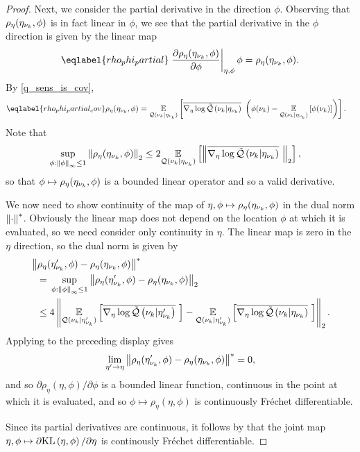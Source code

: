 \begin{lem}
\begin{proof}
Next, we consider the partial derivative in the direction $\phi$.  Observing
that $\rho_\eta(\eta_{\nu_{k}}, \phi)$ is in fact linear in $\phi$, we see that the
partial derivative in the $\phi$ direction is given by the linear map
%
\begin{align}\eqlabel{rho_phi_partial}
%
\fracat{\partial \rho_\eta(\etanuk, \phi)}
       {\partial \phi}{\eta, \phi} \phi =
    \rho_\eta(\etanuk, \phi).
%
\end{align}
%
By  \eqref{q_sens_is_cov},
%
\begin{align}\eqlabel{rho_phi_partial_cov}
%
\rho_\eta(\etanuk, \phi) ={}&
\expect{\q(\nuk \vert \etanuk)}
       {\lqgradbar{\nuk \vert \etanuk} \left(
        \phi(\nuk) - \expect{\q(\nuk \vert \etanuk)}{\phi(\nuk)}
       \right)
       }.
%
\end{align}
%
Note that
%
\begin{align*}
%
\sup_{\phi: \norminf{\phi} \le 1} \norm{\rho_\eta(\etanuk, \phi)}_2 \le{}&
    2 \expect{\q(\nuk \vert \etanuk)}
             {\norm{\lqgradbar{\nuk \vert \etanuk}}_2
             },
%
\end{align*}
%
so that $\phi \mapsto \rho_\eta(\eta_{\nu_{k}}, \phi)$ is a bounded linear operator and
so a valid derivative.

We now need to show continuity of the map of $\eta, \phi \mapsto
\rho_\eta(\eta_{\nu_{k}}, \phi)$ in the dual norm $\left\Vert\cdot\right\Vert^*$.  Obviously the
linear map does not depend on the location $\phi$ at which it is evaluated, so
we need consider only continuity in $\eta$.  The linear map is zero in the
$\eta$ direction, so the dual norm is given by
%
\begin{align*}
%
\MoveEqLeft
\norm{\rho_\eta(\etanuk', \phi) - \rho_\eta(\etanuk, \phi)}^* \\={}&
\sup_{\phi: \norminf{\phi} \le 1}
    \norm{\rho_\eta(\etanuk', \phi) - \rho_\eta(\etanuk, \phi)}_2 \\\le{}&
4 \norm{
    \expect{\q(\nuk \vert \etanuk')}{\lqgradbar{\nuk \vert \etanuk'}} -
    \expect{\q(\nuk \vert \etanuk')}{\lqgradbar{\nuk \vert \etanuk}}
}_2.
%
\end{align*}
%
Applying  to the preceding display gives
%
\begin{align*}
%
\lim_{\eta' \rightarrow \eta}
    \norm{\rho_\eta(\etanuk', \phi) - \rho_\eta(\etanuk, \phi)}^* = 0,
%
\end{align*}
%
and so $\partial \rho_\eta(\eta, \phi) / \partial \phi$ is a bounded linear
function, continuous in the point at which it is evaluated, and so $\phi \mapsto
\rho_\eta(\eta, \phi)$ is continuously Fr{\'e}chet differentiable.

Since its partial derivatives are continuous, it follows by \citet[Proposition
4.14(c)]{zeidler:2013:functional} that the joint map $\eta, \phi \mapsto
\partial \mathrm{KL}\left(\eta, \phi\right) / \partial \eta$ is continously Fr{\'e}chet
differentiable.

%
\end{proof}
%
\end{lem}


